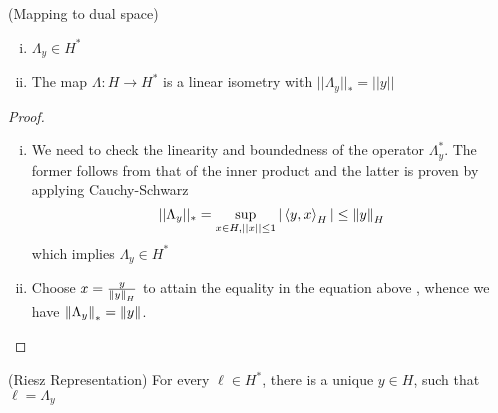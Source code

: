 \documentclass{article}
\begin{document}
\begin{lemma}
    (Mapping to dual space)
    \begin{enumerate}[i)]
        \item $\Lambda_y \in H^*$
        \item The map $\Lambda: H \to H^*$ is a linear isometry with $||\Lambda_y||_{*}=||y||$
    \end{enumerate}
\end{lemma}  

\begin{proof}
    \begin{enumerate}[i)]
        \item We need to check the linearity and boundedness of the operator $\Lambda_y^*$. The former follows from that of the inner product and the latter is proven by applying Cauchy-Schwarz  
        \begin{equation*}
            ||\Lambda_y||_* = \sup_{x\in H, ||x|| \leq 1} |\left<{y},{x}\right>_H| \leq \left\|{y}\right\|_H
        \end{equation*}  
        which implies $\Lambda_y \in H^*$
        
        \item Choose $x = \frac{y}{\left\|{y}\right\|_H}$ to attain the equality in the equation above , whence we have $\left\|{\Lambda_y}\right\|_*=\left\|{y}\right\|$.
    \end{enumerate}
\end{proof}

\begin{theorem}
    (Riesz Representation)  
    For every $\ell \in H^*$, there is a unique $y \in H$, such that $\ell=\Lambda_y$
\end{theorem}  
\end{document}
